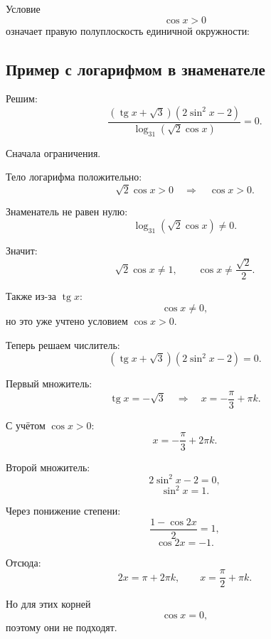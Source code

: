 \documentclass[a4paper,12pt]{article}
\providecommand{\tg}{\mathop{\mathrm{tg}}\nolimits}
\begin{document}
Условие
\[
\cos x>0
\]
означает правую полуплоскость единичной окружности:

\begin{center}
\end{center}

\subsection{Пример с логарифмом в знаменателе}

Решим:
\[
\frac{(\tg x+\sqrt3)(2\sin^2x-2)}
{\log_{31}(\sqrt2\cos x)}=0.
\]

Сначала ограничения.

Тело логарифма положительно:
\[
\sqrt2\cos x>0
\quad\Rightarrow\quad
\cos x>0.
\]

Знаменатель не равен нулю:
\[
\log_{31}(\sqrt2\cos x)\ne0.
\]

Значит:
\[
\sqrt2\cos x\ne1,
\qquad
\cos x\ne\frac{\sqrt2}{2}.
\]

Также из-за $\tg x$:
\[
\cos x\ne0,
\]
но это уже учтено условием $\cos x>0$.

Теперь решаем числитель:
\[
(\tg x+\sqrt3)(2\sin^2x-2)=0.
\]

Первый множитель:
\[
\tg x=-\sqrt3
\quad\Rightarrow\quad
x=-\frac{\pi}{3}+\pi k.
\]

С учётом $\cos x>0$:
\[
x=-\frac{\pi}{3}+2\pi k.
\]

Второй множитель:
\[
2\sin^2x-2=0,
\]
\[
\sin^2x=1.
\]

Через понижение степени:
\[
\frac{1-\cos2x}{2}=1,
\]
\[
\cos2x=-1.
\]

Отсюда:
\[
2x=\pi+2\pi k,
\qquad
x=\frac{\pi}{2}+\pi k.
\]

Но для этих корней
\[
\cos x=0,
\]
поэтому они не подходят.
\end{document}
